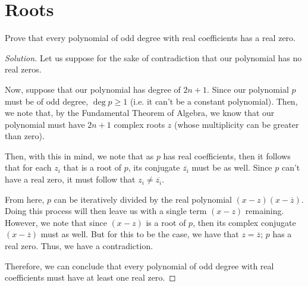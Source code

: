 \documentclass{article}
\newenvironment{solution}{\begin{proof}[Solution]}{\end{proof}}
\begin{document}
	\section{Roots}
	\begin{hw}
		Prove that every polynomial of odd degree with real coefficients has a real zero.
	\end{hw}
	\begin{solution}
		Let us suppose for the sake of contradiction that our polynomial has no real zeros.
		
		Now, suppose that our polynomial has degree of $2n+1$. Since our polynomial $p$ must be of odd degree, $\deg p \geq 1$ (i.e. it can't be a constant polynomial). Then, we note that, by the Fundamental Theorem of Algebra, we know that our polynomial must have $2n+1$ complex roots $z$ (whose multiplicity can be greater than zero).
		
		Then, with this in mind, we note that as $p$ has real coefficients, then it follows that for each $z_{i}$ that is a root of $p$, its conjugate $\overline{z_{i}}$ must be as well. Since $p$ can't have a real zero, it must follow that $z_{i} \neq \overline{z_{i}}$.
		
		From here, $p$ can be iteratively divided by the real polynomial $(x-z)(x-\overline{z})$. Doing this process will then leave us with a single term $(x-z)$ remaining. However, we note that since $(x-z)$ is a root of $p$, then its complex conjugate $(x-\overline{z})$ must as well. But for this to be the case, we have that $z = \overline{z}$; $p$ has a real zero. Thus, we have a contradiction.
		
		Therefore, we can conclude that every polynomial of odd degree with real coefficients must have at least one real zero.
	\end{solution}
\end{document}
